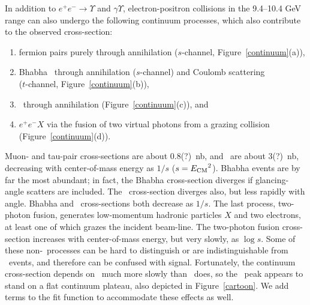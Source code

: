 \documentclass{cornell}
\begin{document}
In addition to $e^+e^- \to \Upsilon$ and $\gamma \Upsilon$,
electron-positron collisions in the 9.4--10.4 GeV range can also
undergo the following continuum processes, which also contribute to
the observed cross-section:  \renewcommand{\labelenumi}{\alph{enumi}.}
\begin{enumerate}

  \item fermion pairs purely through annihilation ($s$-channel,
    Figure~\ref{continuum}(a)),

  \item Bhabha \ee\ through annihilation ($s$-channel) and Coulomb
    scattering \\ (\mbox{$t$-channel,} Figure~\ref{continuum}(b)),

  \item \gamgam\ through annihilation (Figure~\ref{continuum}(c)), and

  \item $e^+e^- X$ via the fusion of two virtual photons from a
    grazing collision (Figure~\ref{continuum}(d)).

\end{enumerate}
Muon- and tau-pair cross-sections are about 0.8(?)~nb, and \qqbar\ are
about 3(?)~nb, decreasing with center-of-mass energy as $1/s$ ($s =
{E_{\mbox{\scriptsize CM}}}^2$).  Bhabha events are by far the most abundant; in
fact, the Bhabha cross-section diverges if glancing-angle scatters are
included.  The \gamgam\ cross-section diverges also, but less rapidly
with angle.  Bhabha and \gamgam\ cross-sections both decrease as
$1/s$.  The last process, two-photon fusion, generates low-momentum
hadronic particles $X$ and two electrons, at least one of which grazes
the incident beam-line.  The two-photon fusion cross-section increases
with center-of-mass energy, but very slowly, as $\log s$.  Some of
these non-\ups\ processes can be hard to distinguish or are
indistinguishable from \ups\ events, and therefore can be confused
with signal.  Fortunately, the continuum cross-section depends on
\ecm\ much more slowly than \ups\ does, so the \ups\ peak appears to
stand on a flat continuum plateau, also depicted in
Figure~\ref{cartoon}.  We add terms to the fit function to accommodate
these effects as well.
\end{document}

